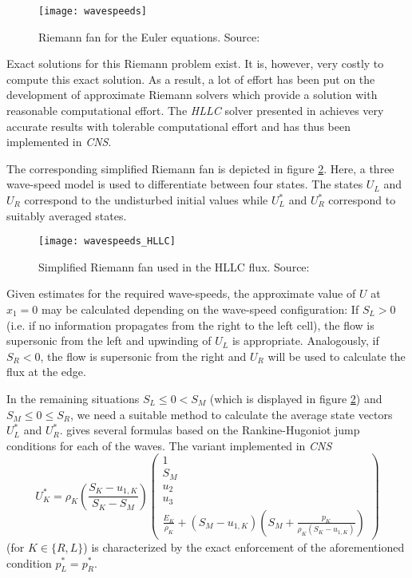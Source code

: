 \begin{figure}
	\centering
	\texttt{[image: wavespeeds]}
	\caption[dummy]{Riemann fan for the Euler equations. Source: \protect\cite{Batten1997}}
	\label{fig:riemann_fan}
\end{figure}

Exact solutions for this Riemann problem exist. It is, however, very costly to
compute this exact solution. As a result, a lot of effort has been put on the
development of approximate Riemann solvers which provide a solution with
reasonable computational effort. The \emph{HLLC} solver presented in
\cite{Toro2009} achieves very accurate results with tolerable computational
effort and has thus been implemented in \emph{CNS}.

The corresponding simplified Riemann fan is depicted in figure
\ref{fig:riemann_fan_hllc}. Here, a three wave-speed model is used to
differentiate between four states. The states $U_L$ and $U_R$ correspond to
the undisturbed initial values while $U_L^*$ and $U_R^*$ correspond to
suitably averaged states.

\begin{figure}
	\centering
	\texttt{[image: wavespeeds\_HLLC]}
	\caption{Simplified Riemann fan used in the HLLC flux. Source: \protect\cite{Batten1997}}
	\label{fig:riemann_fan_hllc}
\end{figure}

Given estimates for the required wave-speeds, the approximate value of $U$ at 
$x_1=0$ may be calculated depending on the wave-speed configuration:
If $S_L > 0$ (i.e. if no information propagates from the right to the left
cell), the flow is supersonic from the left and upwinding of $U_L$ is
appropriate. Analogously, if $S_R < 0$, the flow is supersonic from the right
and $U_R$ will be used to calculate the flux at the edge.

In the remaining situations $S_L \leq 0 < S_M$ (which is displayed in figure
\ref{fig:riemann_fan_hllc}) and $S_M \leq 0 \leq S_R$, we need a suitable method
to calculate the average state vectors $U_L^*$ and $U_R^*$. \cite{Toro2009}
gives several formulas based on the Rankine-Hugoniot jump conditions for
each of the waves. The variant implemented in \emph{CNS}
\begin{equation}
	\label{eqn:hllc_intermediate_states}
	U_K^* = \rho_K \left(\frac{S_K - u_{1,K}}{S_K - S_M} \right)
		\begin{pmatrix}
			1\\
			S_M\\
			u_2\\
			u_3\\
			\frac{E_K}{\rho_K} + (S_M - u_{1,K})
				\left(S_M + \frac{p_K}{\rho_K(S_K - u_{1,K})} \right)
		\end{pmatrix}
\end{equation}
(for $K \in \{R, L\}$) is characterized by the exact enforcement of the
aforementioned condition $p_L^*=p_R^*$.

